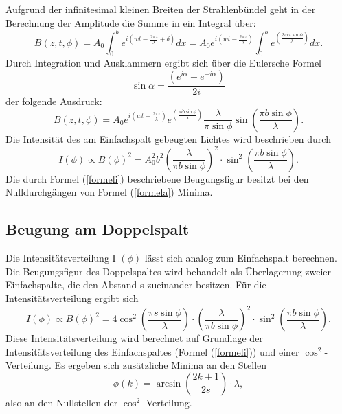 \documentclass[11pt,ngerman,a4paper]{article}
\begin{document}
Aufgrund der infinitesimal kleinen Breiten der Strahlenbündel geht in der Berechnung der Amplitude die Summe in ein Integral über:
\begin{equation}
B (z, t, \phi) = A_0 \int_0^b {e^{i\left(wt-\frac{2 \pi z}{\lambda}+ \delta \right) } dx} = A_0 e^{i \left( wt- \frac{2 \pi z}{\lambda} \right)} \int_0^b {e^{\left( \frac{2 \pi i x \sin \phi}{\lambda} \right) }} dx.
\end{equation}
Durch Integration und Ausklammern ergibt sich über die Eulersche Formel
\begin{equation}
\sin \alpha = \frac{\left( e^{i \alpha} - e^{-i \alpha} \right)}{2i}
\end{equation}
der folgende Ausdruck:
\begin{equation}
B (z,t,\phi) = A_0 e^{i\left( wt- \frac{2 \pi z}{\lambda}\right)} e^{\left( \frac{\pi i b \sin \phi}{\lambda}\right)} \frac{\lambda}{\pi \sin \phi} \sin \left( \frac{\pi b \sin \phi}{\lambda} \right).
\label{formela}
\end{equation}
Die Intensität des am Einfachspalt gebeugten Lichtes wird beschrieben durch
\begin{equation}
I (\phi) \propto B (\phi)^2 = A_0^2 b^2 \left ( \frac {\lambda}{\pi b \sin \phi} \right) ^2 \cdot \sin^2 \left( \frac{\pi b \sin \phi}{\lambda} \right).
\label{formeli}
\end{equation}
Die durch Formel (\ref{formeli}) beschriebene Beugungsfigur besitzt bei den Nulldurchgängen von Formel (\ref{formela}) Minima.
\subsection{Beugung am Doppelspalt}
Die Intensitätsverteilung I $(\phi)$ lässt sich analog zum Einfachspalt berechnen. Die Beugungsfigur des Doppelspaltes wird behandelt als Überlagerung zweier Einfachspalte, die den Abstand s zueinander besitzen.
Für die Intensitätsverteilung ergibt sich
\begin{equation}
I (\phi) \propto B(\phi)^2 = 4 \cos^2 \left( \frac{\pi s \sin \phi}{\lambda} \right) \cdot \left( \frac{\lambda}{\pi b \sin \phi} \right)^2 \cdot \sin^2 \left( \frac{\pi b \sin \phi}{\lambda} \right).
\end{equation}
Diese Intensitätsverteilung wird berechnet auf Grundlage der Intensitätsverteilung des Einfachspaltes (Formel (\ref{formeli})) und einer $\cos^2$-Verteilung. Es ergeben sich zusätzliche Minima an den Stellen
\begin{equation}
\phi(k) = \arcsin \left( \frac{2k+1}{2s} \right) \cdot \lambda,
\end{equation}
also an den Nullstellen der $\cos^2$-Verteilung.
\end{document}
